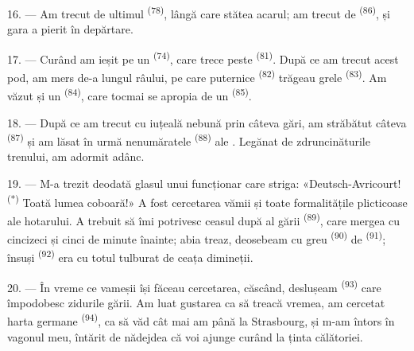 16. --- Am trecut de ultimul  \textsuperscript{(78)}, lângă care
stătea acarul; am trecut de  \textsuperscript{(86)}, și gara a
pierit în depărtare.

17. --- Curând am ieșit pe un  \textsuperscript{(74)}, care
trece peste  \textsuperscript{(81)}. După ce am trecut acest pod, am
mers de-a lungul râului, pe care  puternice
\textsuperscript{(82)} trăgeau  grele \textsuperscript{(83)}. Am
văzut și un  \textsuperscript{(84)}, care tocmai se
apropia de un  \textsuperscript{(85)}.

18. --- După ce am trecut cu iuțeală nebună prin câteva gări, am străbătut câteva
 \textsuperscript{(87)} și am lăsat în urmă nenumăratele
 \textsuperscript{(88)} ale . Legănat de
zdruncinăturile trenului, am adormit adânc.

\VUsaut{3.0mm}
\VUsaut{3.0mm}

19. --- M-a trezit deodată glasul unui funcționar care striga: «Deutsch-Avricourt!
\textsuperscript{(*)} Toată lumea coboară!» A fost cercetarea vămii și toate
formalitățile plicticoase ale hotarului. A trebuit să îmi potrivesc ceasul după
 al gării \textsuperscript{(89)}, care mergea cu cincizeci
și cinci de minute înainte; abia treaz, deosebeam cu greu 
\textsuperscript{(90)} de  \textsuperscript{(91)}; însuși
 \textsuperscript{(92)} era cu totul tulburat de ceața dimineții.

20. --- În vreme ce vameșii își făceau cercetarea, căscând, deslușeam
 \textsuperscript{(93)} care împodobesc zidurile gării. Am luat
gustarea ca să treacă vremea, am cercetat harta  germane
\textsuperscript{(94)}, ca să văd cât mai am până la Strasbourg, și m-am întors în
vagonul meu, întărit de nădejdea că voi ajunge curând la ținta călătoriei.
\VUsaut{6.0mm}
\VUfilet{22mm}
